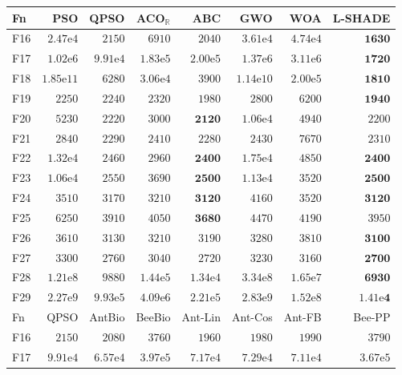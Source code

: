 \begin{tabular}{lrrrrrrr}
\toprule
Fn & PSO & QPSO & ACO$_\mathbb{R}$ & ABC & GWO & WOA & L-SHADE \\
\midrule
F16 & $2.47\mathrm{e}{4}$ & $2150$ & $6910$ & $2040$ & $3.61\mathrm{e}{4}$ & $4.74\mathrm{e}{4}$ & $\mathbf{1630}$ \\
F17 & $1.02\mathrm{e}{6}$ & $9.91\mathrm{e}{4}$ & $1.83\mathrm{e}{5}$ & $2.00\mathrm{e}{5}$ & $1.37\mathrm{e}{6}$ & $3.11\mathrm{e}{6}$ & $\mathbf{1720}$ \\
F18 & $1.85\mathrm{e}{11}$ & $6280$ & $3.06\mathrm{e}{4}$ & $3900$ & $1.14\mathrm{e}{10}$ & $2.00\mathrm{e}{5}$ & $\mathbf{1810}$ \\
F19 & $2250$ & $2240$ & $2320$ & $1980$ & $2800$ & $6200$ & $\mathbf{1940}$ \\
F20 & $5230$ & $2220$ & $3000$ & $\mathbf{2120}$ & $1.06\mathrm{e}{4}$ & $4940$ & $2200$ \\
F21 & $2840$ & $2290$ & $2410$ & $2280$ & $2430$ & $7670$ & $2310$ \\
F22 & $1.32\mathrm{e}{4}$ & $2460$ & $2960$ & $\mathbf{2400}$ & $1.75\mathrm{e}{4}$ & $4850$ & $\mathbf{2400}$ \\
F23 & $1.06\mathrm{e}{4}$ & $2550$ & $3690$ & $\mathbf{2500}$ & $1.13\mathrm{e}{4}$ & $3520$ & $\mathbf{2500}$ \\
F24 & $3510$ & $3170$ & $3210$ & $\mathbf{3120}$ & $4160$ & $3520$ & $\mathbf{3120}$ \\
F25 & $6250$ & $3910$ & $4050$ & $\mathbf{3680}$ & $4470$ & $4190$ & $3950$ \\
F26 & $3610$ & $3130$ & $3210$ & $3190$ & $3280$ & $3810$ & $\mathbf{3100}$ \\
F27 & $3300$ & $2760$ & $3040$ & $2720$ & $3230$ & $3160$ & $\mathbf{2700}$ \\
F28 & $1.21\mathrm{e}{8}$ & $9880$ & $1.44\mathrm{e}{5}$ & $1.34\mathrm{e}{4}$ & $3.34\mathrm{e}{8}$ & $1.65\mathrm{e}{7}$ & $\mathbf{6930}$ \\
F29 & $2.27\mathrm{e}{9}$ & $9.93\mathrm{e}{5}$ & $4.09\mathrm{e}{6}$ & $2.21\mathrm{e}{5}$ & $2.83\mathrm{e}{9}$ & $1.52\mathrm{e}{8}$ & $\mathbf{1.41\mathrm{e}{4}}$ \\
\midrule
Fn & QPSO & AntBio & BeeBio & Ant-Lin & Ant-Cos & Ant-FB & Bee-PP \\
\midrule
F16 & $2150$ & $2080$ & $3760$ & $1960$ & $1980$ & $1990$ & $3790$ \\
F17 & $9.91\mathrm{e}{4}$ & $6.57\mathrm{e}{4}$ & $3.97\mathrm{e}{5}$ & $7.17\mathrm{e}{4}$ & $7.29\mathrm{e}{4}$ & $7.11\mathrm{e}{4}$ & $3.67\mathrm{e}{5}$ \\

\end{tabular}
